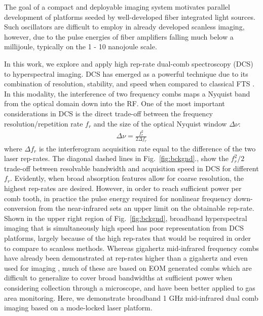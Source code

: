 \documentclass{optica-article}
\begin{document}
The goal of a compact and deployable imaging system motivates parallel development of platforms seeded by well-developed fiber integrated light sources. Such oscillators are difficult to employ in already developed scanless imaging, however, due to the pulse energies of fiber amplifiers falling much below a millijoule, typically on the 1 - 10 nanojoule scale. 

In this work, we explore and apply high rep-rate dual-comb spectroscopy (DCS) to hyperspectral imaging. DCS has emerged as a powerful technique due to its combination of resolution, stability, and speed when compared to classical FTS \cite{coddingtonDualcombSpectroscopy2016}. In this modality, the interference of two frequency combs maps a Nyquist band from the optical domain down into the RF. One of the most important considerations in DCS is the direct trade-off between the frequency resolution/repetition rate $f_r$ and the size of the optical Nyquist window $\Delta \nu$:
% 
\begin{align}
    \Delta \nu = \frac{f_r^2}{2 \Delta f_r}
\end{align}
% 
where $\Delta f_r$ is the interferogram acquisition rate equal to the difference of the two laser rep-rates. The diagonal dashed lines in \mbox{Fig. \ref{fig:bckgnd}}., show the $f_r^2/2$ trade-off between resolvable bandwidth and acquisition speed in DCS for different $f_r$. Evidently, when broad absorption features allow for coarse resolution, the highest rep-rates are desired. However, in order to reach sufficient power per comb tooth, in practice the pulse energy required for nonlinear frequency down-conversion from the near-infrared sets an upper limit on the obtainable rep-rate. Shown in the upper right region of \mbox{Fig. \ref{fig:bckgnd}}, broadband hyperspectral imaging that is simultaneously high speed has poor representation from DCS platforms, largely because of the high rep-rates that would be required in order to compare to scanless methods. Whereas gigahertz mid-infrared frequency combs have already been demonstrated at rep-rates higher than a gigahertz \cite{kowligyMidinfraredFrequencyCombs2020} and even used for imaging \cite{ullahkhanDirectHyperspectralDualcomb2020,khanSubGHzOpticalResolution2023}, much of these are based on EOM generated combs which are difficult to generalize to cover broad bandwidths at sufficient power when considering collection through a microscope, and have been better applied to gas area monitoring. Here, we demonstrate broadband 1 GHz mid-infrared dual comb imaging based on a mode-locked laser platform.
\end{document}
